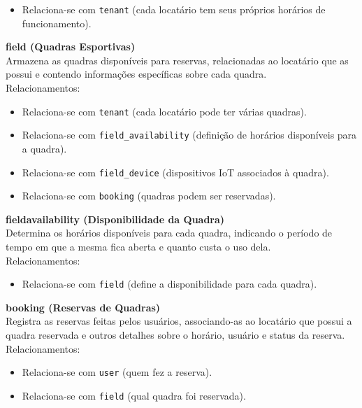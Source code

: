 \begin{itemize} 
	\item Relaciona-se com \texttt{tenant} (cada locatário tem seus próprios horários de funcionamento). 
\end{itemize}


\textbf{field (Quadras Esportivas)}\\
Armazena as quadras disponíveis para reservas, relacionadas ao locatário que as possui e contendo informações específicas sobre cada quadra. \\
Relacionamentos: 

\begin{itemize} 
	\item Relaciona-se com \texttt{tenant} (cada locatário pode ter várias quadras). 
	\item Relaciona-se com \texttt{field\_availability} (definição de horários disponíveis para a quadra). 
	\item Relaciona-se com \texttt{field\_device} (dispositivos IoT associados à quadra). 
	\item Relaciona-se com \texttt{booking} (quadras podem ser reservadas). 
\end{itemize}


\textbf{field\textunderscore availability (Disponibilidade da Quadra)}\\
Determina os horários disponíveis para cada quadra, indicando o período de tempo em que a mesma fica aberta e quanto custa o uso dela. \\
Relacionamentos: 

\begin{itemize} 
	\item Relaciona-se com \texttt{field} (define a disponibilidade para cada quadra). 
\end{itemize}


\textbf{booking (Reservas de Quadras)}\\
Registra as reservas feitas pelos usuários, associando-as ao locatário que possui a quadra reservada e outros detalhes sobre o horário, usuário e status da reserva. \\
Relacionamentos: 

\begin{itemize} 
	\item Relaciona-se com \texttt{user} (quem fez a reserva). 
	\item Relaciona-se com \texttt{field} (qual quadra foi reservada). 
\end{itemize}


